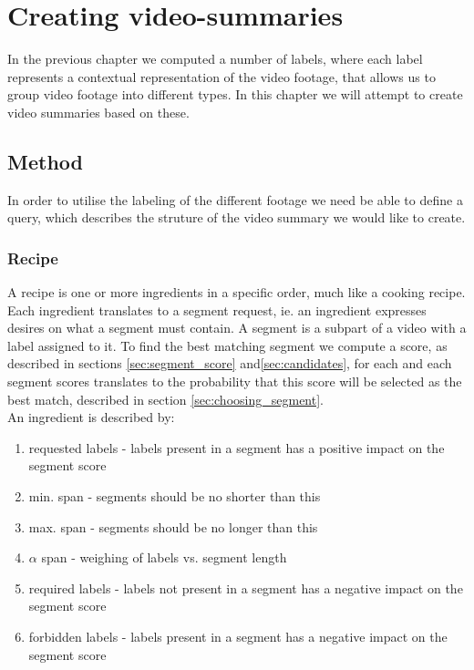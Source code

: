 %
\chapter{Creating video-summaries}
%
In the previous chapter we computed a number of labels, where each label represents a contextual representation of the video footage, that allows us to group video footage into different types. In this chapter we will attempt to create video summaries based on these. 
%
\section{Method}
%
In order to utilise the labeling of the different footage we need be able to define a query, which describes the struture of the video summary we would like to create.
%
\subsection{Recipe}
%
A recipe is one or more ingredients in a specific order, much like a cooking recipe. Each ingredient translates to a segment request, ie. an ingredient expresses desires on what a segment must contain. A segment is a subpart of a video with a label assigned to it. To find the best matching segment we compute a score, as described in sections \ref{sec:segment_score} and\ref{sec:candidates}, for each and each segment scores translates to the probability that this score will be selected as the best match, described in section \ref{sec:choosing_segment}.\\
An ingredient is described by:
%
\begin{enumerate}
\item requested labels - labels present in a segment has a positive impact on the segment score
\item min. span - segments should be no shorter than this
\item max. span - segments should be no longer than this
\item $\alpha$ span - weighing of labels vs. segment length
\item required labels - labels not present in a segment has a negative impact on the segment score
\item forbidden labels - labels present in a segment has a negative impact on the segment score
\end{enumerate}
%
